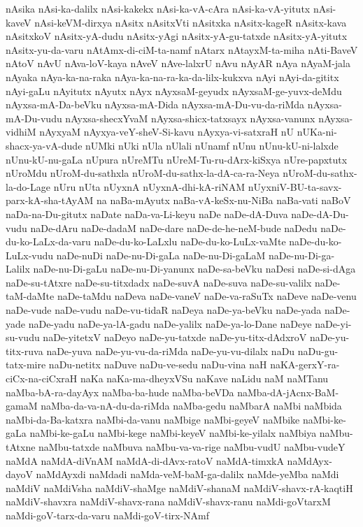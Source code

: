 {nAsika
nAsi-ka-dalilx
nAsi-kakekx
nAsi-ka-vA-cAra
nAsi-ka-vA-yitutx
nAsi-kaveV
nAsi-keVM-dirxya
nAsitx
nAsitxVti
nAsitxka
nAsitx-kageR
nAsitx-kava
nAsitxkoV
nAsitx-yA-dudu
nAsitx-yAgi
nAsitx-yA-gu-tatxde
nAsitx-yA-yitutx
nAsitx-yu-da-varu
nAtAmx-di-ciM-ta-namf
nAtarx
nAtayxM-ta-miha
nAti-BaveV
nAtoV
nAvU
nAva-loV-kaya
nAveV
nAve-lalxrU
nAvu
nAyAR
nAya
nAyaM-jala
nAyaka
nAya-ka-na-raka
nAya-ka-na-ra-ka-da-lilx-kukxva
nAyi
nAyi-da-gititx
nAyi-gaLu
nAyitutx
nAyutx
nAyx
nAyxsaM-geyudx
nAyxsaM-ge-yuvx-deMdu
nAyxsa-mA-Da-beVku
nAyxsa-mA-Dida
nAyxsa-mA-Du-vu-da-riMda
nAyxsa-mA-Du-vudu
nAyxsa-shecxYvaM
nAyxsa-shicx-tatxsayx
nAyxsa-vanunx
nAyxsa-vidhiM
nAyxyaM
nAyxya-veY-sheV-Si-kavu
nAyxya-vi-satxraH
nU
nUKa-ni-shacx-ya-vA-dude
nUMki
nUki
nUla
nUlali
nUnamf
nUnu
nUnu-kU-ni-lalxde
nUnu-kU-nu-gaLa
nUpura
nUreMTu
nUreM-Tu-ru-dArx-kiSxya
nUre-papxtutx
nUroMdu
nUroM-du-sathxla
nUroM-du-sathx-la-dA-ca-ra-Neya
nUroM-du-sathx-la-do-Lage
nUru
nUta
nUyxnA
nUyxnA-dhi-kA-riNAM
nUyxniV-BU-ta-savx-parx-kA-sha-tAyAM
na
naBa-mAyutx
naBa-vA-keSx-nu-NiBa
naBa-vati
naBoV
naDa-na-Du-gitutx
naDate
naDa-va-Li-keyu
naDe
naDe-dA-Duva
naDe-dA-Du-vudu
naDe-dAru
naDe-dadaM
naDe-dare
naDe-de-he-neM-bude
naDedu
naDe-du-ko-LaLx-da-varu
naDe-du-ko-LaLxlu
naDe-du-ko-LuLx-vaMte
naDe-du-ko-LuLx-vudu
naDe-nuDi
naDe-nu-Di-gaLa
naDe-nu-Di-gaLaM
naDe-nu-Di-ga-Lalilx
naDe-nu-Di-gaLu
naDe-nu-Di-yanunx
naDe-sa-beVku
naDesi
naDe-si-dAga
naDe-su-tAtxre
naDe-su-titxdadx
naDe-suvA
naDe-suva
naDe-su-valilx
naDe-taM-daMte
naDe-taMdu
naDeva
naDe-vaneV
naDe-va-raSuTx
naDeve
naDe-venu
naDe-vude
naDe-vudu
naDe-vu-tidaR
naDeya
naDe-ya-beVku
naDe-yada
naDe-yade
naDe-yadu
naDe-ya-lA-gadu
naDe-yalilx
naDe-ya-lo-Dane
naDeye
naDe-yi-su-vudu
naDe-yitetxV
naDeyo
naDe-yu-tatxde
naDe-yu-titx-dAdxroV
naDe-yu-titx-ruva
naDe-yuva
naDe-yu-vu-da-riMda
naDe-yu-vu-dilalx
naDu
naDu-gu-tatx-mire
naDu-netitx
naDuve
naDu-ve-sedu
naDu-vina
naH
naKA-gerxY-ra-ciCx-na-ciCxraH
naKa
naKa-ma-dheyxVSu
naKave
naLidu
naM
naMTanu
naMba-bA-ra-dayAyx
naMba-ba-hude
naMba-beVDa
naMba-dA-jAcnx-BaM-gamaM
naMba-da-va-nA-du-da-riMda
naMba-gedu
naMbarA
naMbi
naMbida
naMbi-da-Ba-katxra
naMbi-da-vanu
naMbige
naMbi-geyeV
naMbike
naMbi-ke-gaLa
naMbi-ke-gaLu
naMbi-kege
naMbi-keyeV
naMbi-ke-yilalx
naMbiya
naMbu-tAtxne
naMbu-tatxde
naMbuva
naMbu-va-va-rige
naMbu-vudU
naMbu-vudeY
naMdA
naMdA-diVnAM
naMdA-di-dAvx-ratoV
naMdA-timxkA
naMdAyx-dayoV
naMdAyxdi
naMdadi
naMda-veM-baM-ga-dalilx
naMde-yeMba
naMdi
naMdiV
naMdiVsha
naMdiV-shaMge
naMdiV-shanaM
naMdiV-shavx-rA-kaqtiH
naMdiV-shavxra
naMdiV-shavx-rana
naMdiV-shavx-ranu
naMdi-goVtarxM
naMdi-goV-tarx-da-varu
naMdi-goV-tirx-NAmf
}
